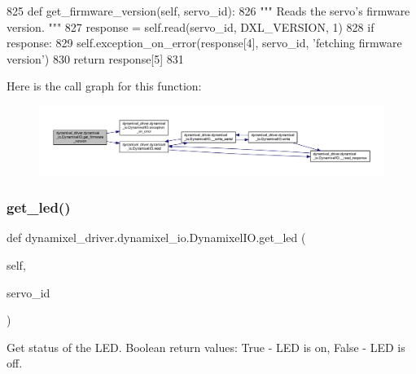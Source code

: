 \begin{DoxyCode}
825     \textcolor{keyword}{def }get\_firmware\_version(self, servo\_id):
826         \textcolor{stringliteral}{""" Reads the servo's firmware version. """}
827         response = self.read(servo\_id, DXL\_VERSION, 1)
828         \textcolor{keywordflow}{if} response:
829             self.exception\_on\_error(response[4], servo\_id, \textcolor{stringliteral}{'fetching firmware version'})
830         \textcolor{keywordflow}{return} response[5]
831 
\end{DoxyCode}
Here is the call graph for this function\+:
\nopagebreak
\begin{figure}[H]
\begin{center}
\leavevmode
\includegraphics[width=350pt]{dd/d77/classdynamixel__driver_1_1dynamixel__io_1_1_dynamixel_i_o_a14d10031059c6c40dae76d3d9324a81c_cgraph}
\end{center}
\end{figure}
\mbox{\label{classdynamixel__driver_1_1dynamixel__io_1_1_dynamixel_i_o_a1080dc1550b89b705ed7995ef4e67349}} 
\subsubsection{\texorpdfstring{get\+\_\+led()}{get\_led()}}
{\footnotesize\ttfamily def dynamixel\+\_\+driver.\+dynamixel\+\_\+io.\+Dynamixel\+I\+O.\+get\+\_\+led (\begin{DoxyParamCaption}\item[{}]{self,  }\item[{}]{servo\+\_\+id }\end{DoxyParamCaption})}

\begin{DoxyVerb}Get status of the LED. Boolean return values:
    True - LED is on,
    False - LED is off.
\end{DoxyVerb}
 

